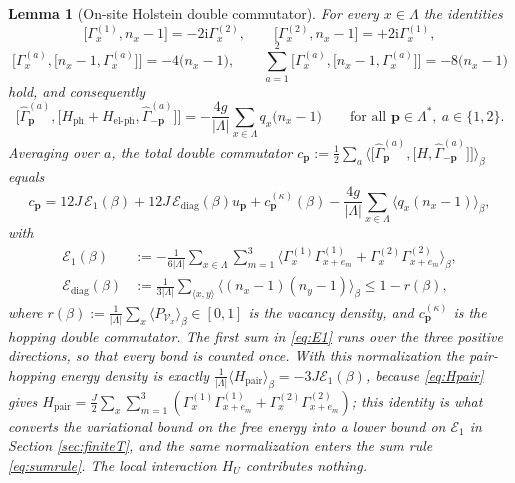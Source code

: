 \documentclass[11pt]{article}
\numberwithin{equation}{section}
\newcommand{\ii}{\mathrm{i}}
\newcommand{\Lamb}{\Lambda}
\newcommand{\Lambstar}{\Lambda^{*}}
\newcommand{\ph}{\mathrm{ph}}
\newcommand{\pair}{\mathrm{pair}}
\newcommand{\Gam}{\Gamma}
\newtheorem{lemma}[theorem]{Lemma}
\theoremstyle{definition}
\begin{document}
\begin{lemma}[On-site Holstein double commutator]\label{lem:on-site}
For every $x\in\Lamb$ the identities
\begin{equation}
\big[\Gam^{(1)}_{x},n_{x}-1\big]=-2\ii\Gam^{(2)}_{x},\qquad
\big[\Gam^{(2)}_{x},n_{x}-1\big]=+2\ii\Gam^{(1)}_{x},
\label{eq:dc1}
\end{equation}
\begin{equation}
\big[\Gam^{(a)}_{x},\big[n_{x}-1,\Gam^{(a)}_{x}\big]\big]=-4\big(n_{x}-1\big),\qquad
\sum_{a=1}^{2}\big[\Gam^{(a)}_{x},\big[n_{x}-1,\Gam^{(a)}_{x}\big]\big]=-8\big(n_{x}-1\big)
\label{eq:dc2}
\end{equation}
hold, and consequently
\begin{equation}
\Big[\hat\Gam^{(a)}_{\mathbf p},\big[H_{\ph}+H_{\text{el-ph}},\hat\Gam^{(a)}_{-\mathbf p}\big]\Big]
=-\frac{4g}{|\Lamb|}\sum_{x\in\Lamb}q_{x}\big(n_{x}-1\big)
\qquad\text{for all }\mathbf p\in\Lambstar,\ a\in\{1,2\}.
\label{eq:dc3}
\end{equation}
Averaging over $a$, the total double commutator
$c_{\mathbf p}:=\frac12\sum_{a}\big\langle\big[\hat\Gam^{(a)}_{\mathbf p},\big[H,\hat\Gam^{(a)}_{-\mathbf p}\big]\big]\big\rangle_{\beta}$
equals
\begin{equation}
c_{\mathbf p}=12J\,\mathcal{E}_{1}(\beta)+12J\,\mathcal{E}_{\mathrm{diag}}(\beta)u_{\mathbf p}+c^{(\kappa)}_{\mathbf p}(\beta)
-\frac{4g}{|\Lamb|}\sum_{x\in\Lamb}\big\langle q_{x}(n_{x}-1)\big\rangle_{\beta},
\label{eq:dc4}
\end{equation}
with
\begin{equation}
\begin{aligned}
\mathcal{E}_{1}(\beta)&:=-\frac{1}{6|\Lamb|}\sum_{x\in\Lamb}\sum_{m=1}^{3}\big\langle\Gam^{(1)}_{x}\Gam^{(1)}_{x+e_{m}}+\Gam^{(2)}_{x}\Gam^{(2)}_{x+e_{m}}\big\rangle_{\beta},\\
\mathcal{E}_{\mathrm{diag}}(\beta)&:=\frac{1}{3|\Lamb|}\sum_{\langle x,y\rangle}\big\langle(n_{x}-1)(n_{y}-1)\big\rangle_{\beta}\le1-r(\beta),
\end{aligned}
\label{eq:E1}
\end{equation}
where $r(\beta):=\frac{1}{|\Lamb|}\sum_{x}\langle P_{\mathcal{V}_{x}}\rangle_{\beta}\in[0,1]$
is the vacancy density, and $c^{(\kappa)}_{\mathbf p}$ is the hopping double commutator.
The first sum in \eqref{eq:E1} runs over the three positive directions, so that every bond is
counted once. With this normalization the pair-hopping energy density is exactly
$\frac{1}{|\Lamb|}\langle H_{\pair}\rangle_{\beta}=-3J\mathcal{E}_{1}(\beta)$, because
\eqref{eq:Hpair} gives
$H_{\pair}=\frac{J}{2}\sum_{x}\sum_{m=1}^{3}(\Gam^{(1)}_{x}\Gam^{(1)}_{x+e_{m}}+\Gam^{(2)}_{x}\Gam^{(2)}_{x+e_{m}})$;
this identity is what converts the variational bound on the free energy into a lower
bound on $\mathcal{E}_{1}$ in Section \ref{sec:finiteT}, and the same normalization
enters the sum rule \eqref{eq:sumrule}. The local interaction $H_{U}$ contributes nothing.
\end{lemma}
\end{document}
